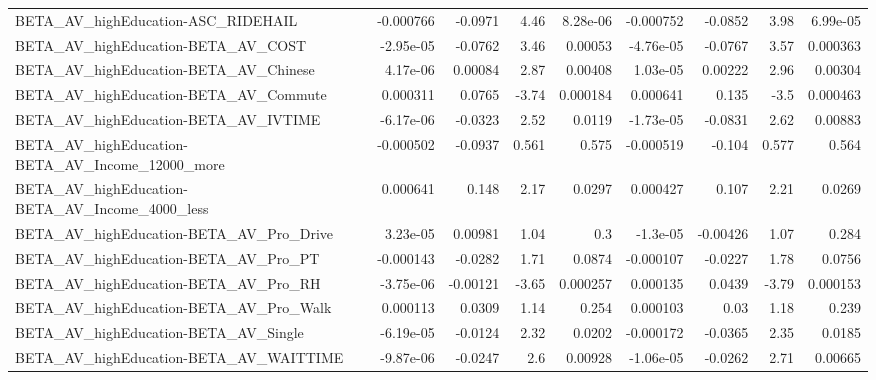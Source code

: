 \begin{tabular}{lrrrrrrrr}
BETA\_AV\_highEducation-ASC\_RIDEHAIL                 &   -0.000766 &      -0.0971 &      4.46 & 8.28e-06 &  -0.000752 &     -0.0852 &         3.98 &      6.99e-05 \\
BETA\_AV\_highEducation-BETA\_AV\_COST                 &   -2.95e-05 &      -0.0762 &      3.46 &  0.00053 &  -4.76e-05 &     -0.0767 &         3.57 &      0.000363 \\
BETA\_AV\_highEducation-BETA\_AV\_Chinese              &    4.17e-06 &      0.00084 &      2.87 &  0.00408 &   1.03e-05 &     0.00222 &         2.96 &       0.00304 \\
BETA\_AV\_highEducation-BETA\_AV\_Commute              &    0.000311 &       0.0765 &     -3.74 & 0.000184 &   0.000641 &       0.135 &         -3.5 &      0.000463 \\
BETA\_AV\_highEducation-BETA\_AV\_IVTIME               &   -6.17e-06 &      -0.0323 &      2.52 &   0.0119 &  -1.73e-05 &     -0.0831 &         2.62 &       0.00883 \\
BETA\_AV\_highEducation-BETA\_AV\_Income\_12000\_more    &   -0.000502 &      -0.0937 &     0.561 &    0.575 &  -0.000519 &      -0.104 &        0.577 &         0.564 \\
BETA\_AV\_highEducation-BETA\_AV\_Income\_4000\_less     &    0.000641 &        0.148 &      2.17 &   0.0297 &   0.000427 &       0.107 &         2.21 &        0.0269 \\
BETA\_AV\_highEducation-BETA\_AV\_Pro\_Drive            &    3.23e-05 &      0.00981 &      1.04 &      0.3 &   -1.3e-05 &    -0.00426 &         1.07 &         0.284 \\
BETA\_AV\_highEducation-BETA\_AV\_Pro\_PT               &   -0.000143 &      -0.0282 &      1.71 &   0.0874 &  -0.000107 &     -0.0227 &         1.78 &        0.0756 \\
BETA\_AV\_highEducation-BETA\_AV\_Pro\_RH               &   -3.75e-06 &     -0.00121 &     -3.65 & 0.000257 &   0.000135 &      0.0439 &        -3.79 &      0.000153 \\
BETA\_AV\_highEducation-BETA\_AV\_Pro\_Walk             &    0.000113 &       0.0309 &      1.14 &    0.254 &   0.000103 &        0.03 &         1.18 &         0.239 \\
BETA\_AV\_highEducation-BETA\_AV\_Single               &   -6.19e-05 &      -0.0124 &      2.32 &   0.0202 &  -0.000172 &     -0.0365 &         2.35 &        0.0185 \\
BETA\_AV\_highEducation-BETA\_AV\_WAITTIME             &   -9.87e-06 &      -0.0247 &       2.6 &  0.00928 &  -1.06e-05 &     -0.0262 &         2.71 &       0.00665 \\

\end{tabular}
